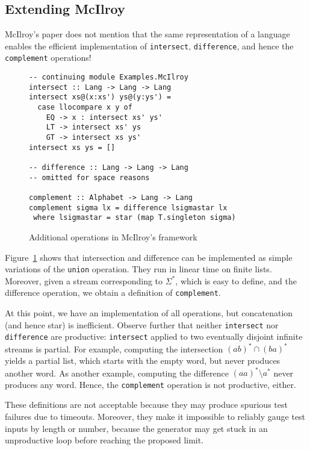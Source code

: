 \subsection{Extending McIlroy}
\label{sec:extending-mcilroy}

McIlroy's paper does not mention that the same representation of a
language enables the efficient implementation of
\lstinline{intersect}, \lstinline{difference}, and hence the
\lstinline{complement} operations!

\begin{figure}[tbp]
\begin{lstlisting}
-- continuing module Examples.McIlroy
intersect :: Lang -> Lang -> Lang
intersect xs@(x:xs') ys@(y:ys') =
  case llocompare x y of
    EQ -> x : intersect xs' ys'
    LT -> intersect xs' ys
    GT -> intersect xs ys'
intersect xs ys = []

-- difference :: Lang -> Lang -> Lang
-- omitted for space reasons

complement :: Alphabet -> Lang -> Lang
complement sigma lx = difference lsigmastar lx
 where lsigmastar = star (map T.singleton sigma)
\end{lstlisting}
\vspace{-\baselineskip}
  \caption{Additional operations in McIlroy's framework}
  \label{fig:more-regular-operators}
\end{figure}
Figure~\ref{fig:more-regular-operators} shows that intersection and difference can be
implemented as simple variations of the \lstinline{union} operation. They run in linear
time on finite lists. Moreover, given a stream corresponding to $\Sigma^*$, which is easy
to define, and the difference operation, we obtain a definition of \lstinline{complement}.

At this point, we have an implementation of all 
operations, but concatenation (and hence star) is
inefficient. Observe further that neither \lstinline{intersect} nor
\lstinline{difference} are productive:
\lstinline{intersect} applied to two eventually disjoint infinite
streams is partial. For example, computing the intersection
$(ab)^* \cap (ba)^*$ yields a partial list, which starts with the
empty word, but never produces another word. As another example,
computing the difference $(aa)^* \setminus a^*$ never produces any
word.  Hence, the \lstinline{complement} operation is not
productive, either.

These definitions are not acceptable because they may produce
spurious test failures due to timeouts. Moreover, they make it
impossible to reliably gauge test inputs by length or number, 
because the generator may get stuck in an unproductive loop before
reaching the proposed limit.

